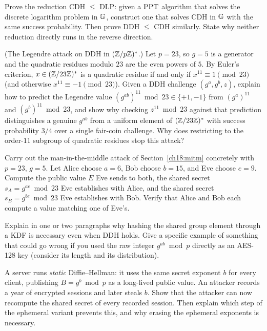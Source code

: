 \begin{exercise}
Prove the reduction CDH $\le$ DLP: given a $\mathrm{PPT}$ algorithm that solves the discrete logarithm problem in $\mathbb{G}$, construct one that solves CDH in $\mathbb{G}$ with the same success probability. Then prove DDH $\le$ CDH similarly. State why neither reduction directly runs in the reverse direction.
\end{exercise}

\begin{exercise}
(The Legendre attack on DDH in $(\mathbb{Z}/p\mathbb{Z})^{*}$.) Let $p = 23$, so $g = 5$ is a generator and the quadratic residues modulo $23$ are the even powers of $5$. By Euler's criterion, $x \in (\mathbb{Z}/23\mathbb{Z})^{*}$ is a quadratic residue if and only if $x^{11} \equiv 1 \pmod{23}$ (and otherwise $x^{11} \equiv -1 \pmod{23}$). Given a DDH challenge $(g^a, g^b, z)$, explain how to predict the Legendre value $(g^{ab})^{11} \bmod 23 \in \{+1, -1\}$ from $(g^a)^{11}$ and $(g^b)^{11} \bmod 23$, and show why checking $z^{11} \bmod 23$ against that prediction distinguishes a genuine $g^{ab}$ from a uniform element of $(\mathbb{Z}/23\mathbb{Z})^{*}$ with success probability $3/4$ over a single fair-coin challenge. Why does restricting to the order-$11$ subgroup of quadratic residues stop this attack?
\end{exercise}

\begin{exercise}
Carry out the man-in-the-middle attack of Section~\ref{ch18:mitm} concretely with $p = 23$, $g = 5$. Let Alice choose $a = 6$, Bob choose $b = 15$, and Eve choose $e = 9$. Compute the public value $E$ Eve sends to both, the shared secret $s_A = g^{ae} \bmod 23$ Eve establishes with Alice, and the shared secret $s_B = g^{be} \bmod 23$ Eve establishes with Bob. Verify that Alice and Bob each compute a value matching one of Eve's.
\end{exercise}

\begin{exercise}
Explain in one or two paragraphs why hashing the shared group element through a KDF is necessary even when DDH holds. Give a specific example of something that could go wrong if you used the raw integer $g^{ab} \bmod p$ directly as an AES-128 key (consider its length and its distribution).
\end{exercise}

\begin{exercise}
A server runs \emph{static} Diffie--Hellman: it uses the same secret exponent $b$ for every client, publishing $B = g^b \bmod p$ as a long-lived public value. An attacker records a year of encrypted sessions and later steals $b$. Show that the attacker can now recompute the shared secret of every recorded session. Then explain which step of the ephemeral variant prevents this, and why erasing the ephemeral exponents is necessary.
\end{exercise}

